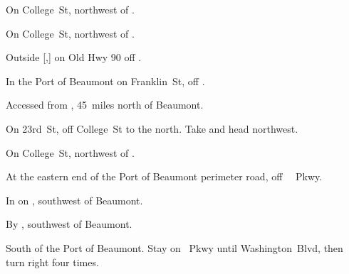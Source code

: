 
\begin{LocationList}

On  College~St, northwest of  .

On  College~St, northwest of  .

Outside [,] on Old Hwy 90 off  .

In the Port of Beaumont on Franklin~St, off  \MLKing.

Accessed from , 45~miles north of Beaumont.

On 23rd~St, off  College~St to the north.
Take   and head northwest.

\Location{\GarageHQ \Garage}
On  College~St, northwest of  .

At the eastern end of the Port of Beaumont perimeter road, off~ \MLKing~Pkwy.

\Location{\TruckService \Service}
In  on , southwest of Beaumont.

\Location{\TruckStop \Gas \Rest \Weigh}
By  , southwest of Beaumont.

South of the Port of Beaumont.
Stay on  \MLKing~Pkwy until Washington~Blvd, then turn right four times.

\end{LocationList}
